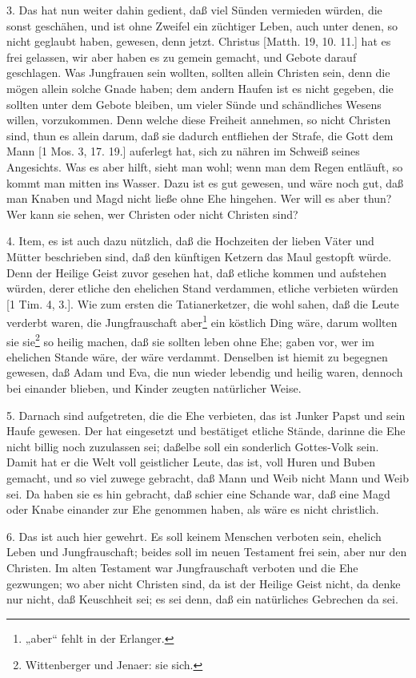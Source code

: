 3. Das hat nun weiter dahin gedient, daß viel Sünden vermieden würden, die sonst geschähen, und ist ohne Zweifel ein züchtiger Leben, auch unter denen, so nicht geglaubt haben, gewesen, denn jetzt. Christus [Matth. 19, 10. 11.] hat es frei gelassen, wir aber haben es zu gemein gemacht, und Gebote darauf geschlagen. Was Jungfrauen sein wollten, sollten allein Christen sein, denn die mögen allein solche Gnade haben; dem andern Haufen ist es nicht gegeben, die sollten unter dem Gebote bleiben, um vieler Sünde und schändliches Wesens willen, vorzukommen. Denn welche diese Freiheit annehmen, so nicht Christen sind, thun es allein darum, daß sie dadurch entfliehen der Strafe, die Gott dem Mann [1 Mos. 3, 17. 19.] auferlegt hat, sich zu nähren im Schweiß seines Angesichts. Was es aber hilft, sieht man wohl; wenn man dem Regen entläuft, so kommt man mitten ins Wasser. Dazu ist es gut gewesen, und wäre noch gut, daß man Knaben und Magd nicht ließe ohne Ehe hingehen. Wer will es aber thun? Wer kann sie sehen, wer Christen oder nicht Christen sind?

4. Item, es ist auch dazu nützlich, daß die Hochzeiten der lieben Väter und Mütter beschrieben sind, daß den künftigen Ketzern das Maul gestopft würde. Denn der Heilige Geist zuvor gesehen hat, daß etliche kommen und aufstehen würden, derer etliche den ehelichen Stand verdammen, etliche verbieten würden [1 Tim. 4, 3.]. Wie zum ersten die Tatianerketzer, die wohl sahen, daß die Leute verderbt waren, die Jungfrauschaft aber\footnote{„aber“ fehlt in der Erlanger.} ein köstlich Ding wäre, darum wollten sie sie\footnote{Wittenberger und Jenaer: sie sich.} so heilig machen, daß sie sollten leben ohne Ehe; gaben vor, wer im ehelichen Stande wäre, der wäre verdammt. Denselben ist hiemit zu begegnen gewesen, daß Adam und Eva, die nun wieder lebendig und heilig waren, dennoch bei einander blieben, und Kinder zeugten natürlicher Weise.

5. Darnach sind aufgetreten, die die Ehe verbieten, das ist Junker Papst und sein Haufe gewesen. Der hat eingesetzt und bestätiget etliche Stände, darinne die Ehe nicht billig noch zuzulassen sei; daßelbe soll ein sonderlich Gottes-Volk sein. Damit hat er die Welt voll geistlicher Leute, das ist, voll Huren und Buben gemacht, und so viel zuwege gebracht, daß Mann und Weib nicht Mann und Weib sei. Da haben sie es hin gebracht, daß schier eine Schande war, daß eine Magd oder Knabe einander zur Ehe genommen haben, als wäre es nicht christlich.

6. Das ist auch hier gewehrt. Es soll keinem Menschen verboten sein, ehelich Leben und Jungfrauschaft; beides soll im neuen Testament frei sein, aber nur den Christen. Im alten Testament war Jungfrauschaft verboten und die Ehe gezwungen; wo aber nicht Christen sind, da ist der Heilige Geist nicht, da denke nur nicht, daß Keuschheit sei; es sei denn, daß ein natürliches Gebrechen da sei.


